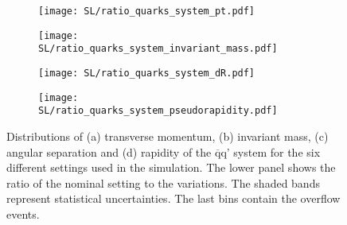 \begin{figure}[H]
    \centering
    \begin{subfigure}{0.49\textwidth}
        \centering
        \texttt{[image: SL/ratio\_quarks\_system\_pt.pdf]}
        \caption{}
        \label{app:subfig:pt(qq)_SL}
    \end{subfigure}
    \begin{subfigure}{0.49\textwidth}
        \centering
        \texttt{[image: SL/ratio\_quarks\_system\_invariant\_mass.pdf]}
        \caption{}
        \label{app:subfig:m(qq)_SL}
    \end{subfigure}

    \vspace{0.2cm}
    
    \begin{subfigure}{0.49\textwidth}
        \centering
        \texttt{[image: SL/ratio\_quarks\_system\_dR.pdf]}
        \caption{}
        \label{app:subfig:dR(qq)_SL}
    \end{subfigure}
    \begin{subfigure}{0.49\textwidth}
        \centering
        \texttt{[image: SL/ratio\_quarks\_system\_pseudorapidity.pdf]}
        \caption{}
        \label{app:subfig:y(qq)_SL}
    \end{subfigure}
    \caption{Distributions of (a) transverse momentum, (b) invariant mass,  (c) angular separation and (d) rapidity of the $\overline{\text{q}}$q' system for the six different settings used in the simulation. The lower panel shows the ratio of the nominal setting to the variations. The shaded bands represent statistical uncertainties. The last bins contain the overflow events.}
    \label{app:fig:qqbar_SL}
\end{figure}



